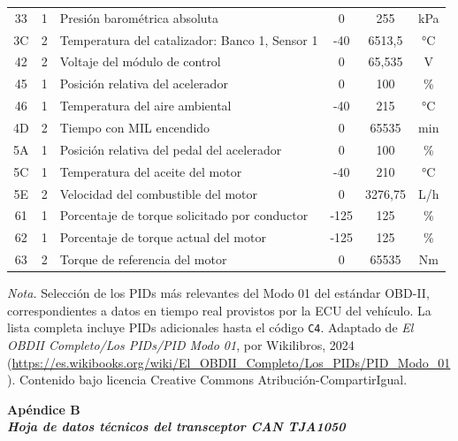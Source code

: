 \begin{supertabular}{ccp{7cm}ccc}
	33 & 1 & Presión barométrica absoluta & 0 & 255 & kPa \\
	3C & 2 & Temperatura del catalizador: Banco 1, Sensor 1 & -40 & 6513,5 & °C \\
	42 & 2 & Voltaje del módulo de control & 0 & 65,535 & V \\
	45 & 1 & Posición relativa del acelerador & 0 & 100 & \% \\
	46 & 1 & Temperatura del aire ambiental & -40 & 215 & °C \\
	4D & 2 & Tiempo con MIL encendido & 0 & 65535 & min \\
	5A & 1 & Posición relativa del pedal del acelerador & 0 & 100 & \% \\
	5C & 1 & Temperatura del aceite del motor & -40 & 210 & °C \\
	5E & 2 & Velocidad del combustible del motor & 0 & 3276,75 & L/h \\
	61 & 1 & Porcentaje de torque solicitado por conductor & -125 & 125 & \% \\
	62 & 1 & Porcentaje de torque actual del motor & -125 & 125 & \% \\
	63 & 2 & Torque de referencia del motor & 0 & 65535 & Nm \\
\end{supertabular}

\vspace{3mm}

	\textit{Nota.} Selección de los PIDs más relevantes del Modo 01 del estándar OBD-II, correspondientes a datos en tiempo real provistos por la ECU del vehículo. La lista completa incluye PIDs adicionales hasta el código \texttt{C4}. Adaptado de \textit{El OBDII Completo/Los PIDs/PID Modo 01}, por Wikilibros, 2024 (\url{https://es.wikibooks.org/wiki/El_OBDII_Completo/Los_PIDs/PID_Modo_01}). Contenido bajo licencia Creative Commons Atribución-CompartirIgual.


\newpage
\cleardoublepage %
\def\thesection{B} %
\label{anexo:tja1050}
\begin{center}
	\bfseries Apéndice B \\
	\normalfont\bfseries\itshape Hoja de datos técnicos del transceptor CAN TJA1050
\end{center}

\vspace{4mm}

